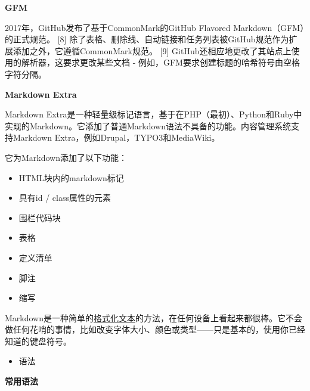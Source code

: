 \documentclass[
]{article}
\begin{document}
\textbf{GFM}

2017年，GitHub发布了基于CommonMark的GitHub Flavored
Markdown（GFM）的正式规范。 {[}8{]}
除了表格、删除线、自动链接和任务列表被GitHub规范作为扩展添加之外，它遵循CommonMark规范。
{[}9{]} GitHub还相应地更改了其站点上使用的解析器，这要求更改某些文档 -
例如，GFM要求创建标题的哈希符号由空格字符分隔。

\textbf{Markdown Extra}

Markdown
Extra是一种轻量级标记语言，基于在PHP（最初）、Python和Ruby中实现的Markdown。它添加了普通Markdown语法不具备的功能。内容管理系统支持Markdown
Extra，例如Drupal，TYPO3和MediaWiki。

它为Markdown添加了以下功能：

\begin{itemize}
\item
  HTML块内的markdown标记
\item
  具有id / class属性的元素
\item
  围栏代码块
\item
  表格
\item
  定义清单
\item
  脚注
\item
  缩写
\end{itemize}

Markdown是一种简单的\href{https://baike.baidu.com/item/格式化文本/15665798}{格式化文本}的方法，在任何设备上看起来都很棒。它不会做任何花哨的事情，比如改变字体大小、颜色或类型------只是基本的，使用你已经知道的键盘符号。

\begin{itemize}
\item
  语法
\end{itemize}

\textbf{常用语法}
\end{document}
